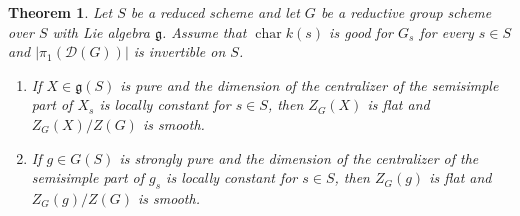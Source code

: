\documentclass[11pt,reqno]{amsart}
\newtheorem{theorem}{Theorem}[section]
\theoremstyle{definition}
\newcommand{\sD}{{\mathscr D}}
\newcommand{\fg}{\mathfrak{g}}
\DeclareMathOperator{\chara}{char}
\begin{document}
\begin{theorem}\label{theorem:flat-pure-centralizer}
Let $S$ be a reduced scheme and let $G$ be a reductive group scheme over $S$ with Lie algebra $\fg$. Assume that $\chara k(s)$ is good for $G_s$ for every $s \in S$ and $|\pi_1(\sD(G))|$ is invertible on $S$.
\begin{enumerate}
    \item\label{item:pure-Lie-algebra-centralizer} If $X \in \fg(S)$ is pure and the dimension of the centralizer of the semisimple part of $X_s$ is locally constant for $s \in S$, then $Z_G(X)$ is flat and $Z_G(X)/Z(G)$ is smooth.
    \item\label{item:strongly-pure-group-section} If $g \in G(S)$ is strongly pure and the dimension of the centralizer of the semisimple part of $g_s$ is locally constant for $s \in S$, then $Z_G(g)$ is flat and $Z_G(g)/Z(G)$ is smooth.
\end{enumerate}
\end{theorem}
\end{document}
